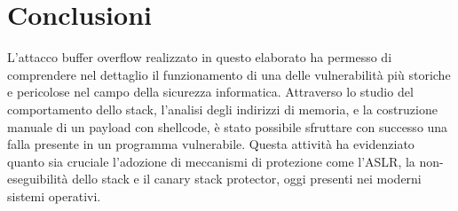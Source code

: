 \documentclass[main.tex]{subfiles}
\begin{document}
\section{Conclusioni}\label{sec:cap 5}

L’attacco buffer overflow realizzato in questo elaborato ha permesso di comprendere nel dettaglio il funzionamento di una delle vulnerabilità più storiche e pericolose nel campo della sicurezza informatica. Attraverso lo studio del comportamento dello stack, l’analisi degli indirizzi di memoria, e la costruzione manuale di un payload con shellcode, è stato possibile sfruttare con successo una falla presente in un programma vulnerabile.
Questa attività ha evidenziato quanto sia cruciale l’adozione di meccanismi di protezione come l’ASLR, la non-eseguibilità dello stack e il canary stack protector, oggi presenti nei moderni sistemi operativi.
\end{document}
